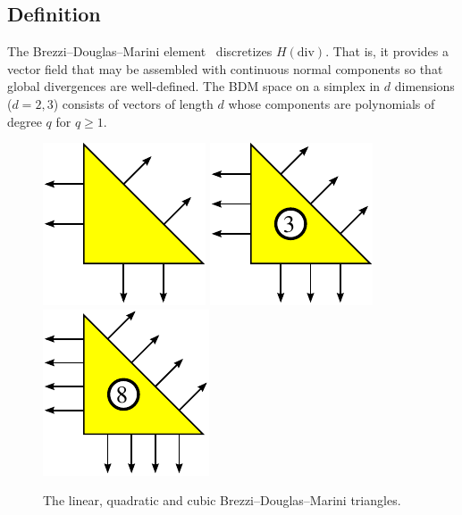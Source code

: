 \subsection{Definition}

The Brezzi--Douglas--Marini element~\cite{BrezziDouglasEtAl1985}
discretizes \( H(\mathrm{div}) \). That is, it provides a vector field
that may be assembled with continuous normal components so that global
divergences are well-defined.  The BDM space on a simplex in \( d \)
dimensions (\( d=2,3 \)) consists of vectors of length \( d \) whose
components are polynomials of degree \( q \) for
\( q \geq 1 \).

\begin{figure}[h]
  \begin{center}
    \includegraphics[width=\smallfig]{chapters/kirby-6/pdf/BDM1.pdf}
    \includegraphics[width=\smallfig]{chapters/kirby-6/pdf/BDM2.pdf}
    \includegraphics[width=\smallfig]{chapters/kirby-6/pdf/BDM3.pdf}
    \caption{The linear, quadratic and cubic Brezzi--Douglas--Marini
      triangles.}
  \end{center}
\end{figure}

